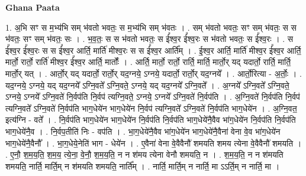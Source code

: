 \documentclass[17pt]{extarticle}
\begin{document}
\textbf{Ghana Paata } \newline

1. अ॒भि सꣳ स म॒भ्य॑भि सम् भ॑वतो भवतः॒ स म॒भ्य॑भि सम् भ॑वतः । . सम् भ॑वतो भवतः॒ सꣳ सम् भ॑वतः॒ स स भ॑वतः॒ सꣳ सम् भ॑वतः॒ सः । . भ॒व॒तः॒ स स भ॑वतो भवतः॒ स ई᳚श्व॒र ई᳚श्व॒रः स भ॑वतो भवतः॒ स ई᳚श्व॒रः । . स ई᳚श्व॒र ई᳚श्व॒रः स स ई᳚श्व॒र आर्ति॒ मार्ति॑ मीश्व॒रः स स ई᳚श्व॒र आर्ति᳚म् । . ई॒श्व॒र आर्ति॒ मार्ति॑ मीश्व॒र ई᳚श्व॒र आर्ति॒ मार्तो॒ रार्तो॒ रार्ति॑ मीश्व॒र ई᳚श्व॒र आर्ति॒ मार्तोः᳚ । . आर्ति॒ मार्तो॒ रार्तो॒ रार्ति॒ मार्ति॒ मार्तो॒र् यद् यदार्तो॒ रार्ति॒ मार्ति॒ मार्तो॒र् यत् । . आर्तो॒र् यद् यदार्तो॒ रार्तो॒र् यद॒ग्नये॒ ऽग्नये॒ यदार्तो॒ रार्तो॒र् यद॒ग्नये᳚ । . आर्तो॒रित्या - अ॒र्तोः॒ । . यद॒ग्नये॒ ऽग्नये॒ यद् यद॒ग्नये᳚ ऽग्नि॒वते᳚ ऽग्नि॒वते॒ ऽग्नये॒ यद् यद॒ग्नये᳚ ऽग्नि॒वते᳚ । . अ॒ग्नये᳚ ऽग्नि॒वते᳚ ऽग्नि॒वते॒ ऽग्नये॒ ऽग्नये᳚ ऽग्नि॒वते॑ नि॒र्वप॑ति नि॒र्वप॑ त्यग्नि॒वते॒ ऽग्नये॒ ऽग्नये᳚ ऽग्नि॒वते॑ नि॒र्वप॑ति । . अ॒ग्नि॒वते॑ नि॒र्वप॑ति नि॒र्वप॑ त्यग्नि॒वते᳚ ऽग्नि॒वते॑ नि॒र्वप॑ति भाग॒धेये॑न भाग॒धेये॑न नि॒र्वप॑ त्यग्नि॒वते᳚ ऽग्नि॒वते॑ नि॒र्वप॑ति भाग॒धेये॑न । . अ॒ग्नि॒वत॒ इत्य॑ग्नि - वते᳚ । . नि॒र्वप॑ति भाग॒धेये॑न भाग॒धेये॑न नि॒र्वप॑ति नि॒र्वप॑ति भाग॒धेये॑नै॒वैव भा॑ग॒धेये॑न नि॒र्वप॑ति नि॒र्वप॑ति भाग॒धेये॑नै॒व । . नि॒र्वप॒तीति॑ निः - वप॑ति । . भा॒ग॒धेये॑नै॒वैव भा॑ग॒धेये॑न भाग॒धेये॑नै॒वैना॑ वेना वे॒व भा॑ग॒धेये॑न भाग॒धेये॑नै॒वैनौ᳚ । . भा॒ग॒धेये॒नेति॑ भाग - धेये॑न । . ए॒वैना॑ वेना वे॒वैवैनौ॑ शमयति शमय त्येना वे॒वैवैनौ॑ शमयति । . ए॒नौ॒ श॒म॒य॒ति॒ श॒म॒य॒ त्ये॒ना॒ वे॒नौ॒ श॒म॒य॒ति॒ न न श॑मय त्येना वेनौ शमयति॒ न । . श॒म॒य॒ति॒ न न श॑मयति शमयति॒ नार्ति॒ मार्ति॒म् न श॑मयति शमयति॒ नार्ति᳚म् । . नार्ति॒ मार्ति॒म् न नार्ति॒ मा ऽऽर्ति॒म् न नार्ति॒ मा । \newline
\end{document}
